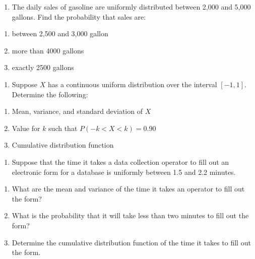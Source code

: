 \documentclass[]{book}
\providecommand{\tightlist}{%
  \setlength{\itemsep}{0pt}\setlength{\parskip}{0pt}}
\begin{document}
\begin{enumerate}
\def\labelenumi{\arabic{enumi}.}
\setcounter{enumi}{11}
\tightlist
\item
  The daily sales of gasoline are uniformly distributed between 2,000 and 5,000 gallons. Find the probability that sales are:
\end{enumerate}

\begin{enumerate}
\def\labelenumi{\alph{enumi})}
\tightlist
\item
  between 2,500 and 3,000 gallon
\item
  more than 4000 gallons
\item
  exactly 2500 gallons
\end{enumerate}

\begin{enumerate}
\def\labelenumi{\arabic{enumi}.}
\setcounter{enumi}{12}
\tightlist
\item
  Suppose \(X\) has a continuous uniform distribution over the interval \([-1,1]\). Determine the following:
\end{enumerate}

\begin{enumerate}
\def\labelenumi{(\alph{enumi})}
\tightlist
\item
  Mean, variance, and standard deviation of \(X\)
\item
  Value for \(k\) such that \(P(-k < X < k ) = 0.90\)
\item
  Cumulative distribution function
\end{enumerate}

\begin{enumerate}
\def\labelenumi{\arabic{enumi}.}
\setcounter{enumi}{13}
\tightlist
\item
  Suppose that the time it takes a data collection operator to fill out an electronic form for a database is uniformly between 1.5 and 2.2 minutes.
\end{enumerate}

\begin{enumerate}
\def\labelenumi{\alph{enumi})}
\tightlist
\item
  What are the mean and variance of the time it takes an operator to fill out the form?
\item
  What is the probability that it will take less than two minutes to fill out the form?
\item
  Determine the cumulative distribution function of the time it takes to fill out the form.
\end{enumerate}
\end{document}

